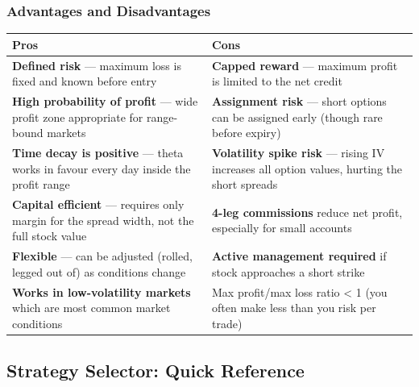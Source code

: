 \documentclass[12pt,openany]{book}
\begin{document}
\subsubsection{Advantages and Disadvantages}

\begin{center}
\scriptsize
\setlength{\tabcolsep}{3pt}
\begin{tabular}{|L{6.00cm}|L{6.00cm}|}
\hline
Pros & Cons \\
\hline
\textbf{Defined risk} — maximum loss is fixed and known before entry & \textbf{Capped reward} — maximum profit is limited to the net credit \\
\hline
\textbf{High probability of profit} — wide profit zone appropriate for range-bound markets & \textbf{Assignment risk} — short options can be assigned early (though rare before expiry) \\
\hline
\textbf{Time decay is positive} — theta works in favour every day inside the profit range & \textbf{Volatility spike risk} — rising IV increases all option values, hurting the short spreads \\
\hline
\textbf{Capital efficient} — requires only margin for the spread width, not the full stock value & \textbf{4-leg commissions} reduce net profit, especially for small accounts \\
\hline
\textbf{Flexible} — can be adjusted (rolled, legged out of) as conditions change & \textbf{Active management required} if stock approaches a short strike \\
\hline
\textbf{Works in low-volatility markets} which are most common market conditions & Max profit/max loss ratio < 1 (you often make less than you risk per trade) \\
\hline
\end{tabular}
\end{center}



\subsection{Strategy Selector: Quick Reference}
\end{document}

